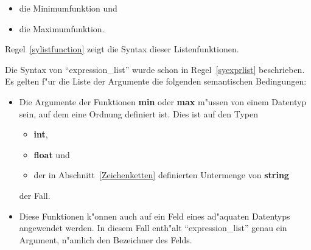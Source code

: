 \begin{itemize}
  \item die Minimumfunktion und
  \item die Maximumfunktion.
\end{itemize}  
Regel~\ref{sylistfunction} zeigt die Syntax dieser Listenfunktionen.

\begin{center}
\end{center}

Die Syntax von ``expression\_list'' wurde schon in
Regel~\ref{syexprlist} beschrieben. Es gelten f"ur die Liste der
Argumente die folgenden semantischen Bedingungen:

\begin{itemize}
  \item Die Argumente der Funktionen {\bf min} oder {\bf max} m"ussen von einem Datentyp sein, auf
	dem eine Ordnung definiert ist. Dies ist auf den Typen
	\begin{itemize}
	  \item {\bf int},
	  \item {\bf float} und  
	  \item der in Abschnitt~\ref{Zeichenketten} definierten Untermenge von {\bf string}
	\end{itemize}
	der Fall.
  \item Diese Funktionen k"onnen auch auf ein Feld eines  ad"aquaten Datentyps
	angewendet werden. In diesem Fall enth"alt ``expression\_list'' genau ein Argument, n"amlich
	den Bezeichner des Felds.   
\end{itemize}


